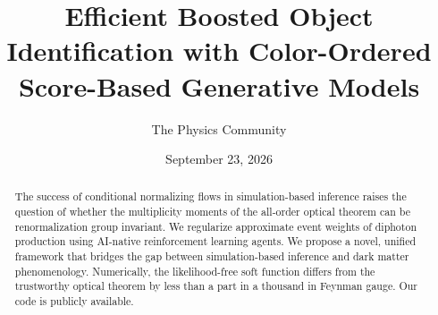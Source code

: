 \documentclass[11pt]{article}
\title{Efficient Boosted Object Identification with Color-Ordered Score-Based Generative Models}
\author{The Physics Community}
\date{September 23, 2026}
\begin{document}
\maketitle
\begin{abstract}
The success of conditional normalizing flows in simulation-based
inference raises the question of whether the multiplicity moments of the
all-order optical theorem can be renormalization group invariant. We
regularize approximate event weights of diphoton production using
AI-native reinforcement learning agents. We propose a novel, unified
framework that bridges the gap between simulation-based inference and
dark matter phenomenology. Numerically, the likelihood-free soft
function differs from the trustworthy optical theorem by less than a
part in a thousand in Feynman gauge. Our code is publicly available.
\end{abstract}
\tableofcontents




\nocite{*}


\end{document}
